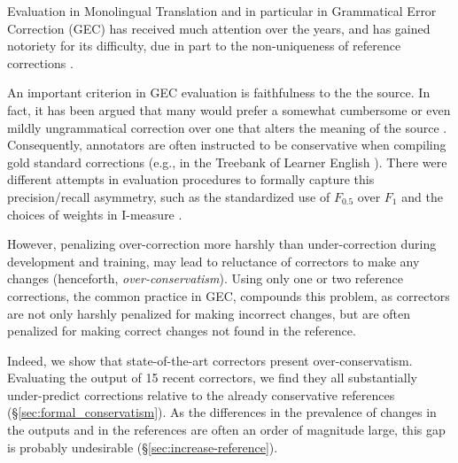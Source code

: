 \documentclass[letterpaper, 11pt]{article}
\begin{document}
Evaluation in Monolingual Translation \cite{xu2015problems,inderjeet2009summarization} and in particular in Grammatical Error Correction (GEC) \cite{tetreault2008native,madnani2011they,felice2015towards,bryant2015far,napoles2015ground} has received much attention over the 
years, and has gained notoriety for its difficulty, due in part to the non-uniqueness of reference corrections \cite{chodorow2012problems}.

An important criterion in GEC evaluation is faithfulness to the the source. 
In fact, it has been argued that many would prefer a somewhat cumbersome or even mildly ungrammatical 
correction over one that alters the meaning of the source \cite{brockett2006correcting}.
Consequently, annotators are often instructed to be conservative when compiling gold standard corrections (e.g., in the Treebank of Learner English \cite{nicholls2003cambridge}).
There were different attempts in evaluation procedures to formally capture this precision/recall asymmetry,
such as the standardized use of $F_{0.5}$ over $F_{1}$ \cite{ng2014conll} and the 
choices of weights in I-measure \cite{felice2015towards}.

However, penalizing over-correction more harshly than under-correction during development and training, 
may lead to reluctance of correctors to make any changes (henceforth, {\it over-conservatism}).
Using only one or two reference corrections, the common practice in GEC, compounds this problem, 
as correctors are not only harshly penalized for making incorrect changes, but are often penalized
for making correct changes not found in the reference.

Indeed, we show that state-of-the-art correctors present over-conservatism.
Evaluating the output of 15 recent correctors, we find they all
substantially under-predict corrections relative to the already conservative references
(\S\ref{sec:formal_conservatism}).
As the differences in the prevalence of changes in the outputs and in the references are
often an order of magnitude large, this gap is probably undesirable (\S\ref{sec:increase-reference}).
\end{document}
